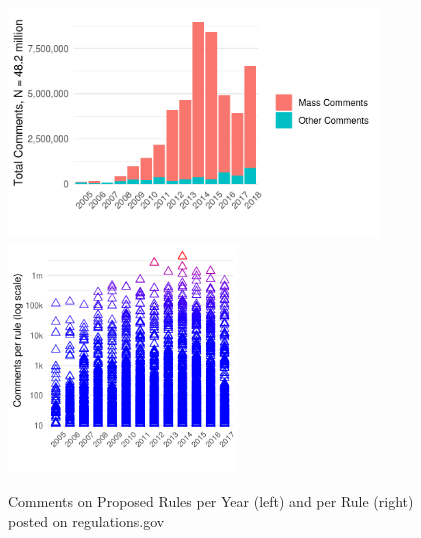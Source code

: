 \begin{figure}
\caption{Comments on Proposed Rules per Year (left) and per Rule (right) posted on regulations.gov}
\centering
\includegraphics[height= 2.4in]{Figs/comments-mass-vs-unique-1.png}
\includegraphics[height= 2.4in]{Figs/rules-comments-per-year-1.png}
\label{fig:comments}
\end{figure}














